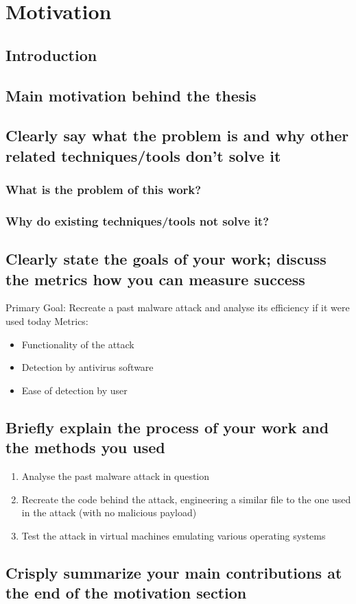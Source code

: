 \chapter{Motivation}
\section{Introduction}
\section{Main motivation behind the thesis}
\section{Clearly say what the problem is and why other related techniques/tools don't solve it}
\subsection{What is the problem of this work?}
\subsection{Why do existing techniques/tools not solve it?}
\section{Clearly state the goals of your work; discuss the metrics how you can measure success}
Primary Goal:
  Recreate a past malware attack and analyse its efficiency if it were used today
Metrics:
\begin{itemize}
  \item Functionality of the attack
  \item Detection by antivirus software
  \item Ease of detection by user
\end{itemize}

\section{Briefly explain the process of your work and the methods you used}
\begin{enumerate}
  \item Analyse the past malware attack in question
  \item Recreate the code behind the attack, engineering a similar file to the one used in the attack (with no malicious payload)
  \item Test the attack in virtual machines emulating various operating systems
\end{enumerate}

\section{Crisply summarize your main contributions at the end of the motivation section}
